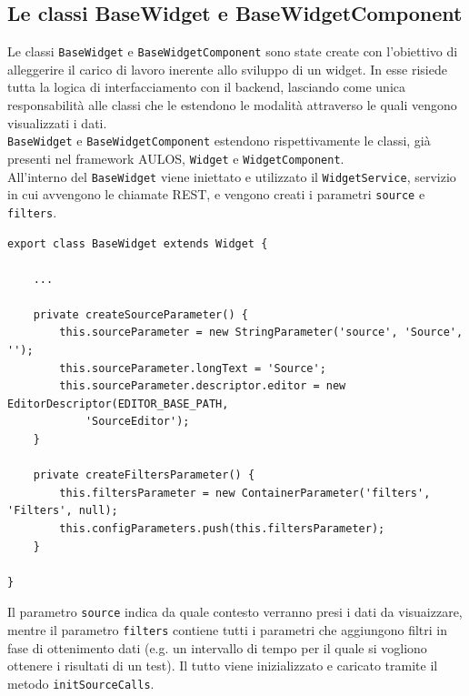 \subsection{Le classi BaseWidget e BaseWidgetComponent}
\label{subsec:base}
Le classi \verb|BaseWidget| e \verb|BaseWidgetComponent| sono state create con l'obiettivo di alleggerire il carico di lavoro inerente allo sviluppo di un widget. In esse risiede tutta la logica di interfacciamento con il backend, lasciando come unica responsabilità alle classi che le estendono le modalità attraverso le quali vengono visualizzati i dati.
\\
\verb|BaseWidget| e \verb|BaseWidgetComponent| estendono rispettivamente le classi, già presenti nel framework AULOS, \verb|Widget| e \verb|WidgetComponent|.
\\
All'interno del \verb|BaseWidget| viene iniettato e utilizzato il \verb|WidgetService|, servizio in cui avvengono le chiamate REST, e vengono creati i parametri \verb|source| e \verb|filters|. 

\begin{lstlisting}[caption={Creazione dei parametri all'interno della classe BaseWidget}, style=javaScriptCode]
export class BaseWidget extends Widget {

    ...

    private createSourceParameter() {
        this.sourceParameter = new StringParameter('source', 'Source', '');
        this.sourceParameter.longText = 'Source';
        this.sourceParameter.descriptor.editor = new EditorDescriptor(EDITOR_BASE_PATH,
            'SourceEditor');
    }

    private createFiltersParameter() {
        this.filtersParameter = new ContainerParameter('filters', 'Filters', null);
        this.configParameters.push(this.filtersParameter);
    }

}
\end{lstlisting}

Il parametro \verb|source| indica da quale contesto verranno presi i dati da visuaizzare, mentre il parametro \verb|filters| contiene tutti i parametri che aggiungono filtri in fase di ottenimento dati (e.g. un intervallo di tempo per il quale si vogliono ottenere i risultati di un test). Il tutto viene inizializzato e caricato tramite il metodo \verb|initSourceCalls|.

